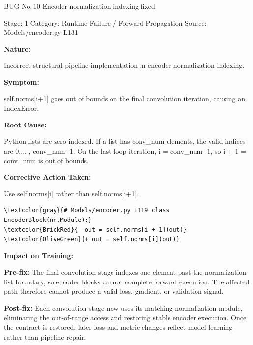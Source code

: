 \documentclass[10pt]{article}
\newcommand{\FieldLabel}[1]{%
 {\bfseries #1:}\par
}
\begin{document}
\begin{bugbox}{BUG No.\,10 \quad Encoder normalization indexing fixed}
{\color{MetaGray}\small Stage: 1 \;\textbar\; Category: Runtime Failure / Forward Propagation \;\textbar\; Source: Models/encoder.py L131\par}
\vspace{0.22em}
\FieldLabel{Nature}
Incorrect structural pipeline implementation in encoder normalization indexing.
\par
\vspace{0.35em}
\FieldLabel{Symptom}
self.norms{[}i+1{]} goes out of bounds on the final convolution iteration, causing an IndexError.
\par
\vspace{0.35em}
\FieldLabel{Root Cause}
Python lists are zero-indexed. If a list has conv\_num elements, the valid indices are 0,... , conv\_num -1. On the last loop iteration, i = conv\_num -1, so i + 1 = conv\_num is out of bounds.
\par
\vspace{0.35em}
\FieldLabel{Corrective Action Taken}
Use self.norms{[}i{]} rather than self.norms{[}i+1{]}.
\par
\vspace{0.35em}
\begin{Verbatim}[commandchars=\\\{\},fontsize=\footnotesize,breaklines=true,breaksymbol={},frame=leftline,framerule=2pt,rulecolor=\color{gray!40},xleftmargin=6pt,formatcom=\singlespacing]
\textcolor{gray}{# Models/encoder.py L119 class EncoderBlock(nn.Module):}
\textcolor{BrickRed}{- out = self.norms[i + 1](out)}
\textcolor{OliveGreen}{+ out = self.norms[i](out)}
\end{Verbatim}
\vspace{0.22em}
\FieldLabel{Impact on Training}
\textbf{Pre-fix:} The final convolution stage indexes one element past the normalization list boundary, so encoder blocks cannot complete forward execution. The affected path therefore cannot produce a valid loss, gradient, or validation signal.\par\smallskip
\textbf{Post-fix:} Each convolution stage now uses its matching normalization module, eliminating the out-of-range access and restoring stable encoder execution. Once the contract is restored, later loss and metric changes reflect model learning rather than pipeline repair.
\par
\vspace{0.35em}
\end{bugbox}
\end{document}
